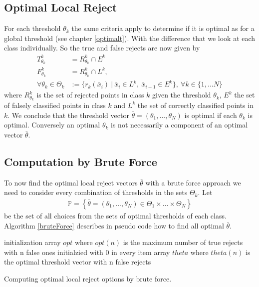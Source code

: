 \subsection{Optimal Local Reject}
For each threshold $\theta_k$ the same criteria apply to determine if it is optimal as for a global threshold (see chapter \ref{optimalt}). With the difference that we look at each class individually. So the true and false rejects are now given by
\begin{align} 
T_{\theta_k}^k &= R_{\theta_k}^k \cap E^k \\ 
F_{\theta_k}^k &= R_{\theta_k}^k \cap L^k, \\
\forall \theta_k \in \Theta_k &:= \{r_k(\bar{x}_i) \ | \ \bar{x}_i \in L^k, \ \bar{x}_{i-1} \in E^k\}, \ \forall k \in \{1,...N\}
\end{align}
where $R_{\theta_k}^k$ is the set of rejected points in class $k$ given the threshold $\theta_k$, $E^k$ the set of falsely classified points in class $k$ and $L^k$ the set of correctly classified points in $k$. We conclude that the threshold vector $\bar{\theta}=(\theta_1,...,\theta_N)$ is optimal if each $\theta_k$ is optimal. Conversely an optimal $\theta_k$ is not necessarily a component of an optimal vector $\bar{\theta}$.


\subsection{Computation by Brute Force}
To now find the optimal local reject vectors $\bar{\theta}$ with a brute force approach we need to consider every combination of thresholds in the sets $\Theta_k$. Let
\begin{align}
\mathbb{P} = \left\{\bar{\theta} = \left(\theta_1,...,\theta_N\right) \in \Theta_1 \times ... \times \Theta_N \right\}
\end{align}
be the set of all choices from the sets of optimal thresholds of each class. Algorithm \ref{bruteForce} describes in pseudo code how to find all optimal $\bar{\theta}$.

\begin{algorithm}[!htbp]
 initialization\;
 array $opt$ where $opt(n)$ is the maximum number of true rejects with n false ones initialzied with $0$ in every item \;
 array $theta$ where $theta(n)$ is the optimal threshold vector with n false rejects \; 
 \BlankLine \BlankLine
 \caption{Computing optimal local reject options by brute force.}
 \label{bruteForce}
\end{algorithm}

